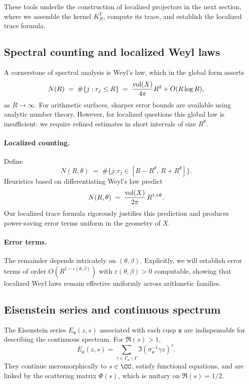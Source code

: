 These tools underlie the construction of localized projectors in the next section, where we assemble the kernel $K_R^Y$, compute its trace, and establish the localized trace formula.

\subsection{Spectral counting and localized Weyl laws}\label{subsec:weyl}

A cornerstone of spectral analysis is Weyl’s law, which in the global form asserts
\[
N(R) \;=\; \#\{ j : r_j \le R\} \;=\; \frac{\operatorname{vol}(X)}{4\pi}R^2 + O(R\log R),
\]
as $R\to\infty$. For arithmetic surfaces, sharper error bounds are available using analytic number theory. However, for localized questions this global law is insufficient: we require refined estimates in short intervals of size $R^\theta$.

\paragraph{Localized counting.}
Define
\[
N(R,\theta) \;=\; \#\{j : r_j \in [R-R^\theta,\, R+R^\theta]\}.
\]
Heuristics based on differentiating Weyl’s law predict
\[
N(R,\theta) \;\sim\; \frac{\operatorname{vol}(X)}{2\pi}\, R^{1+\theta}.
\]
Our localized trace formula rigorously justifies this prediction and produces power-saving error terms uniform in the geometry of $X$.

\paragraph{Error terms.}
The remainder depends intricately on $(\theta,\beta)$. Explicitly, we will establish error terms of order $O(R^{1-\varepsilon(\theta,\beta)})$ with $\varepsilon(\theta,\beta)>0$ computable, showing that localized Weyl laws remain effective uniformly across arithmetic families.

\subsection{Eisenstein series and continuous spectrum}\label{subsec:eisenstein}

The Eisenstein series $E_\mathfrak{a}(z,s)$ associated with each cusp $\mathfrak{a}$ are indispensable for describing the continuous spectrum. For $\Re(s)>1$,
\[
E_\mathfrak{a}(z,s) = \sum_{\gamma \in \Gamma_\mathfrak{a}\backslash \Gamma} \Im(\sigma_\mathfrak{a}^{-1}\gamma z)^s.
\]
They continue meromorphically to $s\in\CC$, satisfy functional equations, and are linked by the scattering matrix $\Phi(s)$, which is unitary on $\Re(s)=1/2$.

